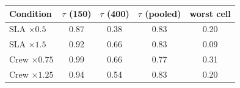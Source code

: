 \begin{tabular}{lcccc}
\toprule
Condition & $\tau$ (150) & $\tau$ (400) & $\tau$ (pooled) & worst cell \\
\midrule
SLA $\times0.5$ & 0.87 & 0.38 & 0.83 & 0.20 \\
SLA $\times1.5$ & 0.92 & 0.66 & 0.83 & 0.09 \\
Crew $\times0.75$ & 0.99 & 0.66 & 0.77 & 0.31 \\
Crew $\times1.25$ & 0.94 & 0.54 & 0.83 & 0.20 \\
\bottomrule
\end{tabular}

